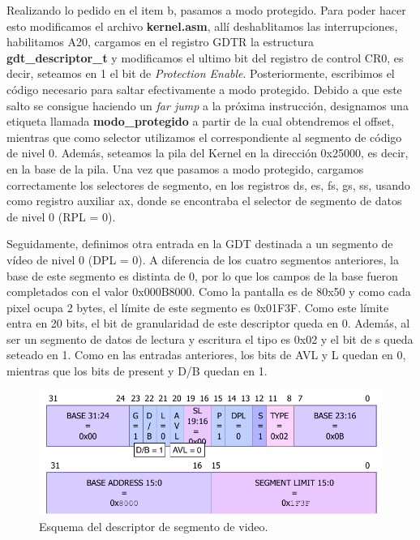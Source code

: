 \documentclass[a4paper]{article}
\begin{document}
\justify
Realizando lo pedido en el item b, pasamos a modo protegido. Para poder hacer esto modificamos el archivo \textbf{kernel.asm}, allí deshablitamos las interrupciones, habilitamos A20, cargamos en el registro GDTR la estructura \textbf{gdt_descriptor_t} y modificamos el ultimo bit del registro de control CR0, es decir, seteamos en 1 el bit de \textit{Protection Enable}. Posteriormente, escribimos el código necesario para saltar efectivamente a modo protegido. Debido a que este salto se consigue haciendo un \textit{far jump} a la próxima instrucción, designamos una etiqueta llamada \textbf{modo_protegido} a partir de la cual obtendremos el offset, mientras que como selector utilizamos el correspondiente al segmento de código de nivel 0. Además, seteamos la pila del Kernel en la dirección 0x25000, es decir, en la base de la pila. Una vez que pasamos a modo protegido, cargamos correctamente los selectores de segmento, en los registros ds, es, fs, gs, ss, usando como registro auxiliar ax, donde se encontraba el selector de segmento de datos de nivel 0 (RPL = 0).


\justify
Seguidamente, definimos otra entrada en la GDT destinada a un segmento de vídeo de nivel 0 (DPL = 0). A diferencia de los cuatro segmentos anteriores, la base de este segmento es distinta de 0, por lo que los campos de la base fueron completados con el valor 0x000B8000. Como la pantalla es de 80x50 y como cada pixel ocupa 2 bytes, el límite de este segmento es 0x01F3F. Como este límite entra en 20 bits, el bit de granularidad de este descriptor queda en 0. Además, al ser un segmento de datos de lectura y escritura el tipo es 0x02 y el bit de s queda seteado en 1. Como en las entradas anteriores, los bits de AVL y L quedan en 0, mientras que los bits de present y D/B quedan en 1.  

\begin{figure}[h]
	\centering
	\includegraphics[scale=0.8]{img/DescriptorVideo.pdf}
	\caption{Esquema del descriptor de segmento de video.}
\end{figure}
\end{document}
